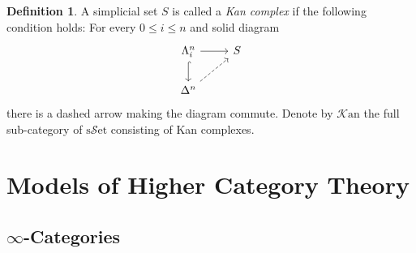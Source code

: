 \documentclass[a4paper]{book}
\newcommand{\lK}{\mathcal{K}}
\newcommand{\lS}{\mathcal{S}}
\newcommand{\set}{\lS\mathrm{et}} %
\newcommand{\sset}{\mathrm{s}\set} %
\newcommand{\Kan}{\lK\mathrm{an}} %
\theoremstyle{definition}
\newtheorem{definition}[equation]{Definition}
\theoremstyle{remark}
\numberwithin{equation}{section}
\begin{document}
\begin{definition}
	A simplicial set $S$ is called a \emph{Kan complex} if the following condition holds: For every $0\leq i\leq n$ and solid diagram \begin{equation}
    \begin{tikzcd}
      \Lambda^n_i \arrow[d,hook]\arrow[r] & S  \\
      \Delta^n \arrow[ru,dashed]
    \end{tikzcd}
  \end{equation}there is a dashed arrow making the diagram commute. Denote by $\Kan$ the full sub-category of $\sset$ consisting of Kan complexes. 
\end{definition}


\section{Models of Higher Category Theory}

\subsection{\texorpdfstring{$\infty$}{oo}-Categories} 
\end{document}
